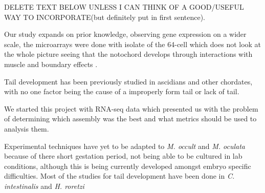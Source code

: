 DELETE TEXT BELOW UNLESS I CAN THINK OF A GOOD/USEFUL WAY TO INCORPORATE(but definitely put in first  sentence). 

Our study expands on prior knowledge, observing gene expression on a wider scale, the microarrays were done with isolate of the 64-cell which does not look at the whole picture seeing that the notochord develops through interactions with muscle and boundary effects \cite{keller_mechanisms_2000,veeman_chongmague_2008}.

Tail development has been previously studied in ascidians and other chordates, with no one factor being the cause of a improperly form tail or lack of tail. 

We started this project with RNA-seq data which presented us with the problem of determining which assembly was the best and what metrics should be used to analysis them.

Experimental techniques have yet to be adapted to \textit{M. occult} and \textit{M. oculata} because of there short gestation period, not being able to be cultured in lab conditions, although this is being currently developed amongst embryo specific difficulties. Most of the studies for tail development have been done in \textit{C. intestinalis} and \textit{H. roretzi}  
